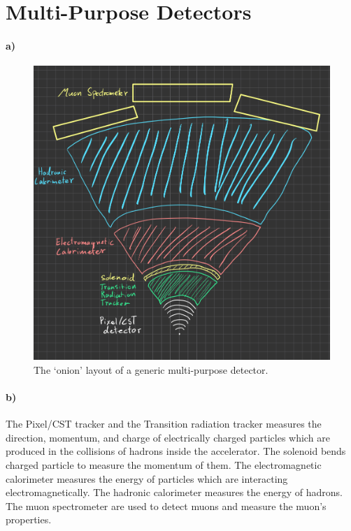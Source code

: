 \section{Multi-Purpose Detectors}
\paragraph{a)}
\begin{figure}[H]
	\centering
	\includegraphics[width=\textwidth]{figures/Atlas.jpeg}
	\caption[]{The `onion' layout of a generic multi-purpose detector.}
\end{figure}

\paragraph{b)} The Pixel/CST tracker and the Transition radiation tracker measures the direction, momentum, and charge of electrically charged particles which are produced in the collisions of hadrons inside the accelerator. The solenoid bends charged particle to measure the momentum of them. The electromagnetic calorimeter measures the energy of particles which are interacting electromagnetically. The hadronic calorimeter measures the energy of hadrons. The muon spectrometer are used to detect muons and measure the muon's properties.

